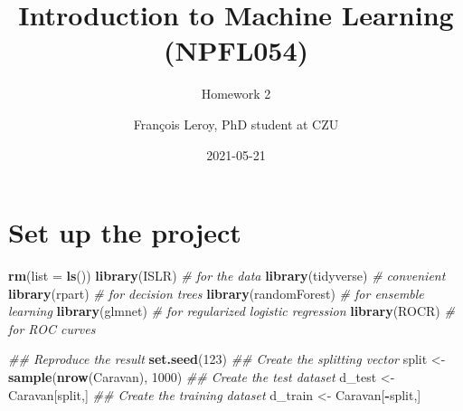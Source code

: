 \documentclass[
  12pt,
  oneside]{report}
\title{Introduction to Machine Learning\\
(NPFL054)}
\subtitle{Homework 2}
\author{François Leroy, PhD student at CZU}
\date{2021-05-21}
\newenvironment{Shaded}{\begin{snugshade}}{\end{snugshade}}
\newcommand{\CommentTok}[1]{\textcolor[rgb]{0.56,0.35,0.01}{\textit{#1}}}
\newcommand{\DataTypeTok}[1]{\textcolor[rgb]{0.13,0.29,0.53}{#1}}
\newcommand{\DecValTok}[1]{\textcolor[rgb]{0.00,0.00,0.81}{#1}}
\newcommand{\KeywordTok}[1]{\textcolor[rgb]{0.13,0.29,0.53}{\textbf{#1}}}
\newcommand{\NormalTok}[1]{#1}
\newcommand{\OperatorTok}[1]{\textcolor[rgb]{0.81,0.36,0.00}{\textbf{#1}}}
\newcommand{\StringTok}[1]{\textcolor[rgb]{0.31,0.60,0.02}{#1}}
\begin{document}
\maketitle


\cleardoublepage 
{}

{
\hypersetup{linkcolor=}
\setcounter{tocdepth}{1}
\tableofcontents
\newpage
}
\vspace{50mm}


\cleardoublepage 
{}


\hypertarget{set-up-the-project}{%
\chapter*{Set up the project}\label{set-up-the-project}}

\begin{Shaded}
\begin{Highlighting}[]
\KeywordTok{rm}\NormalTok{(}\DataTypeTok{list =} \KeywordTok{ls}\NormalTok{())}
\KeywordTok{library}\NormalTok{(ISLR) }\CommentTok{# for the data}
\KeywordTok{library}\NormalTok{(tidyverse) }\CommentTok{# convenient}
\KeywordTok{library}\NormalTok{(rpart) }\CommentTok{# for decision trees}
\KeywordTok{library}\NormalTok{(randomForest) }\CommentTok{# for ensemble learning}
\KeywordTok{library}\NormalTok{(glmnet) }\CommentTok{# for regularized logistic regression}
\KeywordTok{library}\NormalTok{(ROCR) }\CommentTok{# for ROC curves}
\end{Highlighting}
\end{Shaded}

\begin{Shaded}
\begin{Highlighting}[]
\CommentTok{## Reproduce the result}
\KeywordTok{set.seed}\NormalTok{(}\DecValTok{123}\NormalTok{)}
\CommentTok{## Create the splitting vector}
\NormalTok{split <-}\StringTok{ }\KeywordTok{sample}\NormalTok{(}\KeywordTok{nrow}\NormalTok{(Caravan), }\DecValTok{1000}\NormalTok{)}
\CommentTok{## Create the test dataset}
\NormalTok{d_test <-}\StringTok{ }\NormalTok{Caravan[split,]}
\CommentTok{## Create the training dataset}
\NormalTok{d_train <-}\StringTok{ }\NormalTok{Caravan[}\OperatorTok{-}\NormalTok{split,]}
\end{Highlighting}
\end{Shaded}
\end{document}
